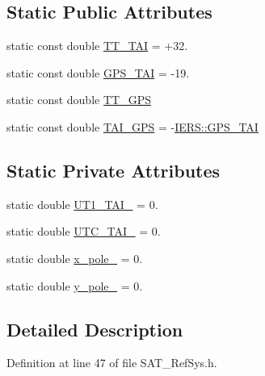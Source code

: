 \subsection*{Static Public Attributes}
\begin{DoxyCompactItemize}
\item 
static const double \hyperlink{classIERS_ab6b095690199dc9789b668eafe93423e}{T\-T\-\_\-\-T\-A\-I} = +32.
\item 
static const double \hyperlink{classIERS_a6289aefd6f6c45e58d7d9ce2e3789c64}{G\-P\-S\-\_\-\-T\-A\-I} = -\/19.
\item 
static const double \hyperlink{classIERS_aa3e35ab4212b649feeaf61764d85c690}{T\-T\-\_\-\-G\-P\-S}
\item 
static const double \hyperlink{classIERS_a7bf84e2e1ee0b01fcfcc4e6e2fe35355}{T\-A\-I\-\_\-\-G\-P\-S} = -\/\hyperlink{classIERS_a6289aefd6f6c45e58d7d9ce2e3789c64}{I\-E\-R\-S\-::\-G\-P\-S\-\_\-\-T\-A\-I}
\end{DoxyCompactItemize}
\subsection*{Static Private Attributes}
\begin{DoxyCompactItemize}
\item 
static double \hyperlink{classIERS_a75a822b27f30fc3369697819de08da84}{U\-T1\-\_\-\-T\-A\-I\-\_\-} = 0.
\item 
static double \hyperlink{classIERS_a4df9d5b7347defccc192c1ab5c437e35}{U\-T\-C\-\_\-\-T\-A\-I\-\_\-} = 0.
\item 
static double \hyperlink{classIERS_ac8c79654837cc32556a29a6d9597f3e8}{x\-\_\-pole\-\_\-} = 0.
\item 
static double \hyperlink{classIERS_a359e82751a2edfbc9d8fe6fa7a9d8061}{y\-\_\-pole\-\_\-} = 0.
\end{DoxyCompactItemize}


\subsection{Detailed Description}


Definition at line 47 of file S\-A\-T\-\_\-\-Ref\-Sys.\-h.



